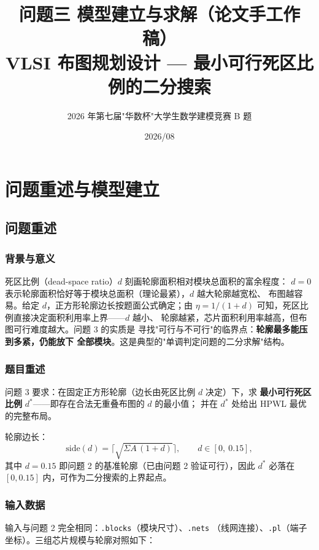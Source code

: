 \documentclass[12pt,a4paper]{article}
\title{\textbf{问题三 模型建立与求解（论文手工作稿）}\\[6pt]
\large VLSI 布图规划设计 --- 最小可行死区比例的二分搜索}
\author{2026 年第七届"华数杯"大学生数学建模竞赛 B 题}
\date{2026/08}
\begin{document}
\maketitle
\tableofcontents
\newpage

\section{问题重述与模型建立}

\subsection{问题重述}

\subsubsection*{背景与意义}

死区比例（dead-space ratio）$d$ 刻画轮廓面积相对模块总面积的富余程度：
$d = 0$ 表示轮廓面积恰好等于模块总面积（理论最紧），$d$ 越大轮廓越宽松、
布图越容易。给定 $d$，正方形轮廓边长按题面公式确定；由
$\eta = 1/(1+d)$ 可知，死区比例直接决定面积利用率上界——$d$ 越小、
轮廓越紧，芯片面积利用率越高，但布图可行难度越大。问题 3 的实质是
寻找"可行与不可行"的临界点：\textbf{轮廓最多能压到多紧，仍能放下
全部模块}。这是典型的"单调判定问题的二分求解"结构。

\subsubsection*{题目重述}

问题 3 要求：在固定正方形轮廓（边长由死区比例 $d$ 决定）下，求
\textbf{最小可行死区比例} $d^*$——即存在合法无重叠布图的 $d$ 的最小值；
并在 $d^*$ 处给出 HPWL 最优的完整布局。

轮廓边长：
\begin{equation}
\label{eq:q3side}
\text{side}(d) = \Big\lceil \sqrt{\Sigma A\,(1+d)} \Big\rceil,
\qquad d \in [0,\ 0.15],
\end{equation}
其中 $d = 0.15$ 即问题 2 的基准轮廓（已由问题 2 验证可行），因此
$d^*$ 必落在 $[0, 0.15]$ 内，可作为二分搜索的上界起点。

\subsubsection*{输入数据}

输入与问题 2 完全相同：\texttt{.blocks}（模块尺寸）、\texttt{.nets}
（线网连接）、\texttt{.pl}（端子坐标）。三组芯片规模与轮廓对照如下：
\end{document}
